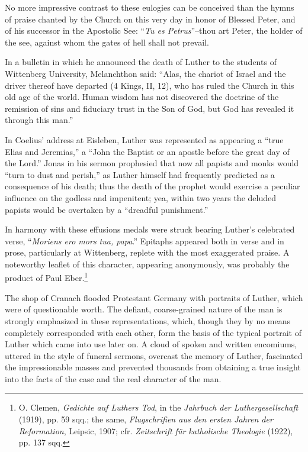 No more impressive contrast to these eulogies can be conceived than
the hymns of praise chanted by the Church on this very day in honor
of Blessed Peter, and of his successor in the Apostolic See: “\textit{Tu es
Petrus}”--thou art Peter, the holder of the see, against whom the
gates of hell shall not prevail.

In a bulletin in which he announced the death of Luther to the
students of Wittenberg University, Melanchthon said: “Alas, the
chariot of Israel and the driver thereof have departed (4 Kings, II,
12), who has ruled the Church in this old age of the world. Human
wisdom has not discovered the doctrine of the remission of sins and
fiduciary trust in the Son of God, but God has revealed it through
this man.”

In Coelius’ address at Eisleben, Luther was represented as appearing
a “true Elias and Jeremias,” a “John the Baptist or an apostle before
the great day of the Lord.” Jonas in his sermon prophesied that now
all papists and monks would “turn to dust and perish,” as Luther himself
had frequently predicted as a consequence of his death; thus the
death of the prophet would exercise a peculiar influence on the godless
and impenitent; yea, within two years the deluded papists would
be overtaken by a “dreadful punishment.”

In harmony with these effusions medals were struck bearing Luther’s celebrated
verse, “\textit{Moriens ero mors tua, papa}.” Epitaphs appeared both in verse and
in prose, particularly at Wittenberg, replete
with the most exaggerated praise. A noteworthy leaflet of this character,
appearing anonymously, was probably the product of Paul
Eber.\footnote
{O. Clemen, \textit{Gedichte auf Luthers Tod}, in the \textit{Jahrbuch der Luthergesellschaft} (1919),
pp. 59 sqq.; the same, \textit{Flugschrifien aus den ersten Jahren der Reformation}, Leipsic, 1907;
cfr. \textit{Zeitschrift für katholische Theologie} (1922), pp. 137 sqq.}

The shop of Cranach flooded Protestant Germany with portraits
of Luther, which were of questionable worth. The defiant,
coarse-grained nature of the man is strongly emphasized in these
representations, which, though they by no means completely corresponded
with each other, form the basis of the typical portrait of Luther
which came into use later on. A cloud of spoken and written encomiums,
uttered in the style of funeral sermons, overcast the memory of Luther,
fascinated the impressionable masses and prevented
thousands from obtaining a true insight into the facts of the case and
the real character of the man.
